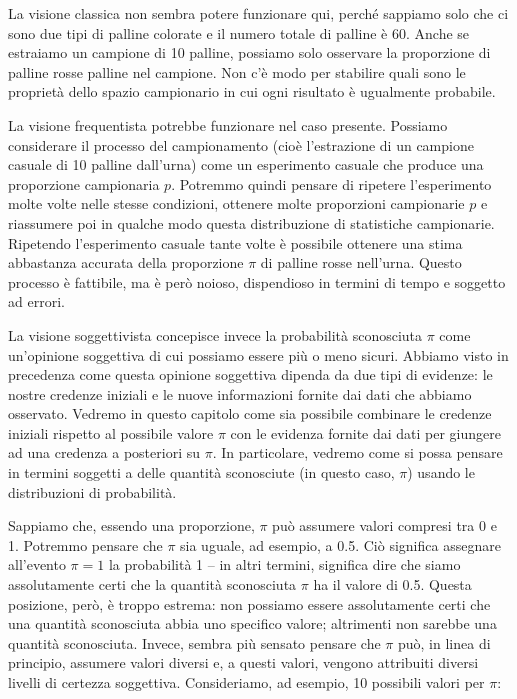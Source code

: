 \documentclass[
  11pt,
]{krantz}
\theoremstyle{definition}
\theoremstyle{definition}
\theoremstyle{definition}
\theoremstyle{definition}
\theoremstyle{remark}
\begin{document}
La visione classica non sembra potere funzionare qui, perché sappiamo solo che ci sono due tipi di palline colorate e il numero totale di palline è 60. Anche se estraiamo un campione di 10 palline, possiamo solo osservare la proporzione di palline rosse palline nel campione. Non c'è modo per stabilire quali sono le proprietà dello spazio campionario in cui ogni risultato è ugualmente probabile.

La visione frequentista potrebbe funzionare nel caso presente. Possiamo considerare il processo del campionamento (cioè l'estrazione di un campione casuale di 10 palline dall'urna) come un esperimento casuale che produce una proporzione campionaria \(p\). Potremmo quindi pensare di ripetere l'esperimento molte volte nelle stesse condizioni, ottenere molte proporzioni campionarie \(p\) e riassumere poi in qualche modo questa distribuzione di statistiche campionarie. Ripetendo l'esperimento casuale tante volte è possibile ottenere una stima abbastanza accurata della proporzione \(\pi\) di palline rosse nell'urna. Questo processo è fattibile, ma è però noioso, dispendioso in termini di tempo e soggetto ad errori.

La visione soggettivista concepisce invece la probabilità sconosciuta \(\pi\) come un'opinione soggettiva di cui possiamo essere più o meno sicuri. Abbiamo visto in precedenza come questa opinione soggettiva dipenda da due tipi di evidenze: le nostre credenze iniziali e le nuove informazioni fornite dai dati che abbiamo osservato. Vedremo in questo capitolo come sia possibile combinare le credenze iniziali rispetto al possibile valore \(\pi\) con le evidenza fornite dai dati per giungere ad una credenza a posteriori su \(\pi\). In particolare, vedremo come si possa pensare in termini soggetti a delle quantità sconosciute (in questo caso, \(\pi\)) usando le distribuzioni di probabilità.

Sappiamo che, essendo una proporzione, \(\pi\) può assumere valori compresi tra 0 e 1. Potremmo pensare che \(\pi\) sia uguale, ad esempio, a 0.5. Ciò significa assegnare all'evento \(\pi = 1\) la probabilità 1 -- in altri termini, significa dire che siamo assolutamente certi che la quantità sconosciuta \(\pi\) ha il valore di 0.5. Questa posizione, però, è troppo estrema: non possiamo essere assolutamente certi che una quantità sconosciuta abbia uno specifico valore; altrimenti non sarebbe una quantità sconosciuta. Invece, sembra più sensato pensare che \(\pi\) può, in linea di principio, assumere valori diversi e, a questi valori, vengono attribuiti diversi livelli di certezza soggettiva. Consideriamo, ad esempio, 10 possibili valori per \(\pi\):
\end{document}
